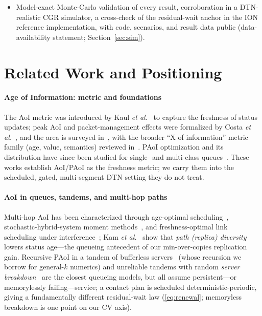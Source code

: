 \documentclass[twocolumn,3p,times,procedia]{elsarticle}
\newcommand{\E}{\mathbb{E}}
\begin{document}
\begin{itemize}
the route-set \emph{latency-diversity potential}---the residual-min
ratio $\E[R_{\min,2}]/\E[R_1]$---spans $0.41$--$0.95$ with the
pass-phase
alignment of the chosen satellite pair. Under route uncertainty this
diversity is what replication converts into freshness (without
uncertainty, a plan-aware single-copy router exploits the same
diversity; Remark~\ref{rem:uncertainty}); because contact plans are
known in advance, the
alignment is computable at planning time, turning the independence
assumption into a route-selection criterion (Section~\ref{sec:sim});
\item Model-exact Monte-Carlo validation of every result, corroboration in
a DTN-realistic CGR simulator, a cross-check of the
residual-wait anchor in the ION reference implementation, with code,
scenarios, and result data public (data-availability statement;
Section~\ref{sec:sim}).
\end{itemize}

\section{Related Work and Positioning}\label{sec:related}
\paragraph*{Age of Information: metric and foundations}
The AoI metric was introduced by Kaul \emph{et al.}~\cite{kaul2012} to
capture the freshness of status updates; peak AoI and packet-management
effects were formalized by Costa \emph{et al.}~\cite{costa2016}, and the
area is surveyed in~\cite{yates2021survey,kosta2017}, with the broader
``X of information'' metric family (age, value, semantics) reviewed
in~\cite{wu2026xoi}. PAoI optimization and
its distribution have since been studied for single- and multi-class
queues~\cite{huang2015,champati2019}. These works establish AoI/PAoI as the
freshness metric; we carry them into the scheduled, gated, multi-segment
DTN setting they do not treat.

\paragraph*{AoI in queues, tandems, and multi-hop paths}
Multi-hop AoI has been characterized through age-optimal
scheduling~\cite{bedewy2019}, stochastic-hybrid-system moment
methods~\cite{yates2020}, and freshness-optimal link scheduling under
interference~\cite{talak2018}; Kam \emph{et al.}~\cite{kam2016} show that
\emph{path (replica) diversity} lowers status age---the queueing antecedent
of our min-over-copies replication gain. Recursive PAoI in a tandem of
bufferless servers~\cite{sinha} (whose recursion we borrow for general-$k$
numerics) and unreliable tandems with random \emph{server
breakdown}~\cite{senthilkumar} are the closest queueing models, but all
assume persistent---or memorylessly failing---service; a contact plan is
scheduled deterministic-periodic, giving a fundamentally different
residual-wait law (\eqref{eq:renewal}; memoryless breakdown is one point on
our CV axis).
\end{document}
